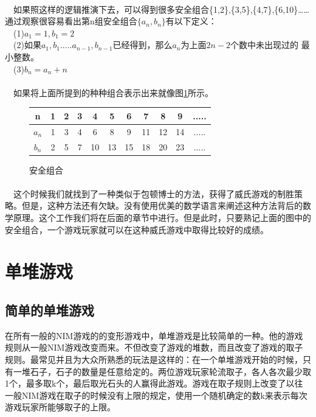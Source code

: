 \documentclass[UTF8,nofonts,cs4size]{ctexrep}
\begin{document}
\paragraph{}
\indent\ \
如果照这样的逻辑推演下去，可以得到很多安全组合\{1,2\},\{3,5\},\{4,7\},\{6,10\}……
通过观察很容易看出第n组安全组合$\{a_n,b_n\}$有以下定义：
\\ \indent\ \ (1)$a_1=1,b_1=2$
\\ \indent\ \ (2)如果$a_1,b_1.....a_{n-1},b_{n-1}$已经得到，那么$a_n$为上面$2n-2$个数中未出现过的
最小整数。
\\ \indent\ \ (3)$b_n=a_n+n$
\paragraph{}
\indent\ \
如果将上面所提到的种种组合表示出来就像图\ref{safe}所示。
\newline
\begin{figure}[htp]
\centering
\begin{tabular}{|c|c|c|c|c|c|c|c|c|c|c|}
\hline n & 1 & 2 & 3 & 4 & 5 & 6 & 7 & 8 & 9 & ..... \\
\hline $a_n$ & 1 & 3 & 4 & 6 & 8 & 9 & 11 & 12 & 14 & ..... \\
\hline $b_n$ & 2 & 5 & 7 & 10 & 13 & 15 & 18 & 20 & 23 & ..... \\
\hline
\end{tabular}
\caption{安全组合}
\label{safe}
\end{figure}
\paragraph{}
\indent\ \
这个时候我们就找到了一种类似于包顿博士的方法，获得了威氏游戏的制胜策略。但是，这种方法还有欠缺。没有使用优美的数学语言来阐述这种方法背后的数学原理。这个工作我们将在后面的章节中进行。但是此时，只要熟记上面的图中的安全组合，一个游戏玩家就可以在这种威氏游戏中取得比较好的成绩。
\section{单堆游戏}
\subsection{简单的单堆游戏}
在所有一般的NIM游戏的的变形游戏中，单堆游戏是比较简单的一种。他的游戏规则从一般NIM游戏改变而来。不但改变了游戏的堆数，而且改变了游戏的取子规则。最常见并且为大众所熟悉的玩法是这样的：在一个单堆游戏开始的时候，只有一堆石子，石子的数量是任意给定的。两位游戏玩家轮流取子，各人各次最少取1个，最多取k个，最后取光石头的人赢得此游戏。游戏在取子规则上改变了以往一般NIM游戏在取子的时候没有上限的规定，使用一个随机确定的数k来表示每次游戏玩家所能够取子的上限。
\end{document}
